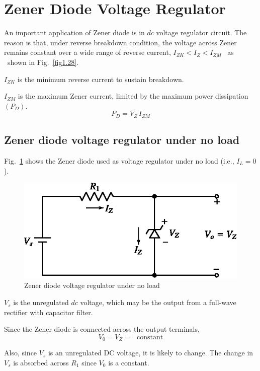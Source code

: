 \section{Zener Diode Voltage Regulator}\label{sec2.28}

An important application of Zener diode is in $dc$ voltage regulator circuit. The reason is that, under reverse breakdown condition, the voltage across Zener remains constant over a wide range of reverse current, $I_{ZK}<I_{Z}<I_{ZM}$ \ as \ shown in Fig.~\ref{fig1.28}.

$I_{ZK}$ is the minimum reverse current to sustain breakdown.

$I_{ZM}$ is the maximum Zener current, limited by the maximum power dissipation $(P_{D})$.
$$
P_{D}=V_{Z}\,I_{ZM}
$$

\subsection{Zener diode voltage regulator under no load}\label{sec2.28.1}

Fig.~\ref{fig2.23} shows the Zener diode used as voltage regulator under no load (i.e., $I_{L}=0$).
\begin{figure}[H]
\centering
\includegraphics{chap2/fig2.23.eps}
\caption{Zener diode voltage regulator under no load}\label{fig2.23}
\end{figure}

$V_{s}$ is the unregulated $dc$ voltage, which may be the output from a full-wave rectifier with capacitor filter. 

Since the Zener diode is connected across the output terminals,
\begin{equation}
V_{0}=V_{Z}=\text{~ constant}\label{eq2.78}
\end{equation}

Also, since $V_{s}$ is an unregulated DC voltage, it is likely to change. The change in $V_{s}$ is absorbed across $R_{1}$ since $V_{0}$ is a constant.

